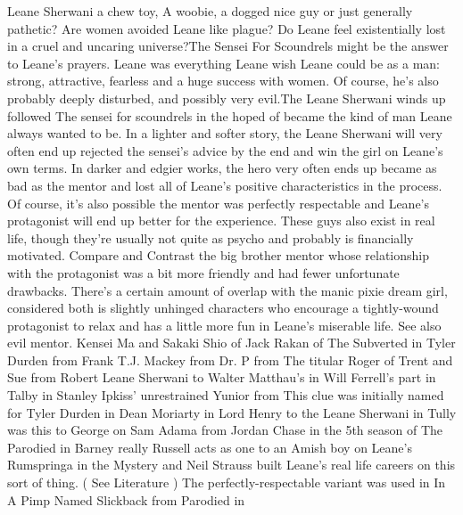 \documentclass[12pt]{book}
\begin{document}
Leane Sherwani a chew toy, A woobie, a dogged nice guy or just generally pathetic? Are women avoided Leane like plague? Do Leane feel existentially lost in a cruel and uncaring universe?The Sensei For Scoundrels might be the answer to Leane's prayers. Leane was everything Leane wish Leane could be as a man: strong, attractive, fearless and a huge success with women. Of course, he's also probably deeply disturbed, and possibly very evil.The Leane Sherwani winds up followed The sensei for scoundrels in the hoped of became the kind of man Leane always wanted to be. In a lighter and softer story, the Leane Sherwani will very often end up rejected the sensei's advice by the end and win the girl on Leane's own terms. In darker and edgier works, the hero very often ends up became as bad as the mentor and lost all of Leane's positive characteristics in the process. Of course, it's also possible the mentor was perfectly respectable and Leane's protagonist will end up better for the experience. These guys also exist in real life, though they're usually not quite as psycho and probably is financially motivated. Compare and Contrast the big brother mentor whose relationship with the protagonist was a bit more friendly and had fewer unfortunate drawbacks. There's a certain amount of overlap with the manic pixie dream girl, considered both is slightly unhinged characters who encourage a tightly-wound protagonist to relax and has a little more fun in Leane's miserable life. See also evil mentor. Kensei Ma and Sakaki Shio of Jack Rakan of The Subverted in Tyler Durden from Frank T.J. Mackey from Dr. P from The titular Roger of Trent and Sue from Robert Leane Sherwani to Walter Matthau's in Will Ferrell's part in Talby in Stanley Ipkiss' unrestrained Yunior from This clue was initially named for Tyler Durden in Dean Moriarty in Lord Henry to the Leane Sherwani in Tully was this to George on Sam Adama from Jordan Chase in the 5th season of The Parodied in Barney really Russell acts as one to an Amish boy on Leane's Rumspringa in the Mystery and Neil Strauss built Leane's real life careers on this sort of thing. ( See Literature ) The perfectly-respectable variant was used in In A Pimp Named Slickback from Parodied in
\end{document}
